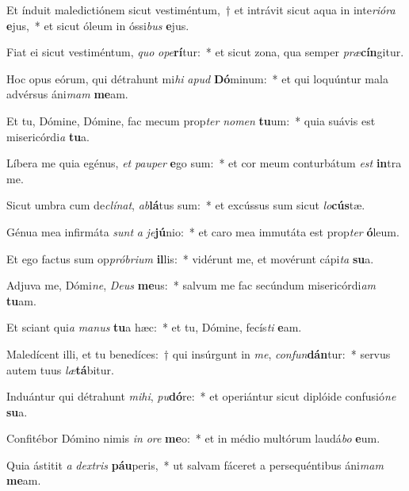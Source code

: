 \item Et índuit maledictiónem sicut vestiméntum,~† et intrávit sicut aqua in inte\textit{ri}\textit{ó}\textit{ra} \textbf{e}jus,~* et sicut óleum in óssi\textit{bus} \textbf{e}jus.
\item Fiat ei sicut vestiméntum, \textit{quo} \textit{o}\textit{pe}\textbf{rí}tur:~* et sicut zona, qua semper \textit{præ}\textbf{cín}gitur.
\item Hoc opus eórum, qui détrahunt mi\textit{hi} \textit{a}\textit{pud} \textbf{Dó}minum:~* et qui loquúntur mala advérsus áni\textit{mam} \textbf{me}am.
\item Et tu, Dómine, Dómine, fac mecum prop\textit{ter} \textit{no}\textit{men} \textbf{tu}um:~* quia suávis est misericórdi\textit{a} \textbf{tu}a.
\item Líbera me quia egénus, \textit{et} \textit{pau}\textit{per} \textbf{e}go sum:~* et cor meum conturbátum \textit{est} \textbf{in}tra me.
\item Sicut umbra cum de\textit{clí}\textit{nat}, \textit{ab}\textbf{lá}tus sum:~* et excússus sum sicut \textit{lo}\textbf{cús}tæ.
\item Génua mea infirmáta \textit{sunt} \textit{a} \textit{je}\textbf{jú}nio:~* et caro mea immutáta est prop\textit{ter} \textbf{ó}leum.
\item Et ego factus sum op\textit{pró}\textit{bri}\textit{um} \textbf{il}lis:~* vidérunt me, et movérunt cápi\textit{ta} \textbf{su}a.
\item Adjuva me, Dómi\textit{ne}, \textit{De}\textit{us} \textbf{me}us:~* salvum me fac secúndum misericórdi\textit{am} \textbf{tu}am.
\item Et sciant qui\textit{a} \textit{ma}\textit{nus} \textbf{tu}a hæc:~* et tu, Dómine, fecís\textit{ti} \textbf{e}am.
\item Maledícent illi, et tu benedíces:~† qui insúrgunt in \textit{me}, \textit{con}\textit{fun}\textbf{dán}tur:~* servus autem tuus \textit{læ}\textbf{tá}bitur.
\item Induántur qui détrahunt \textit{mi}\textit{hi}, \textit{pu}\textbf{dó}re:~* et operiántur sicut diplóide confusió\textit{ne} \textbf{su}a.
\item Confitébor Dómino nimis \textit{in} \textit{o}\textit{re} \textbf{me}o:~* et in médio multórum laudá\textit{bo} \textbf{e}um.
\item Quia ástitit \textit{a} \textit{dex}\textit{tris} \textbf{páu}peris,~* ut salvam fáceret a persequéntibus áni\textit{mam} \textbf{me}am.
